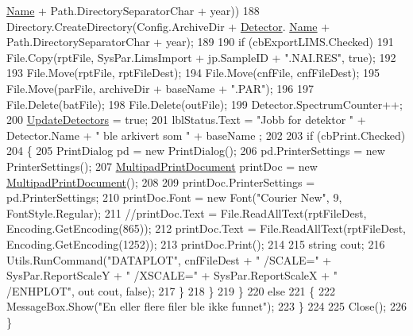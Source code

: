 \begin{DoxyCode}
      \hyperlink{class_scintilab_1_1_detector_aeddbda805641ca8d8f8aaa30aea2f3e0}{Name} + Path.DirectorySeparatorChar + year))
188                         Directory.CreateDirectory(Config.ArchiveDir + \hyperlink{class_scintilab_1_1_form_job_report_acfd377f5214f1677dbfcee75e848fd3e}{Detector}.
      \hyperlink{class_scintilab_1_1_detector_aeddbda805641ca8d8f8aaa30aea2f3e0}{Name} + Path.DirectorySeparatorChar + year);
189 
190                     \textcolor{keywordflow}{if} (cbExportLIMS.Checked)    
191                         File.Copy(rptFile, SysPar.LimsImport + jp.SampleID + \textcolor{stringliteral}{".NAI.RES"}, \textcolor{keyword}{true});
192 
193                     File.Move(rptFile, rptFileDest);
194                     File.Move(cnfFile, cnfFileDest);
195                     File.Move(parFile, archiveDir + baseName + \textcolor{stringliteral}{".PAR"});
196                     
197                     File.Delete(batFile);
198                     File.Delete(outFile);
199                     Detector.SpectrumCounter++;
200                     \hyperlink{class_scintilab_1_1_form_job_report_a03fca1552c0a65c4e526318e880941ff}{UpdateDetectors} = \textcolor{keyword}{true};
201                     lblStatus.Text = \textcolor{stringliteral}{"Jobb for detektor "} + Detector.Name + \textcolor{stringliteral}{" ble arkivert som "} + baseName
      ;
202 
203                     \textcolor{keywordflow}{if} (cbPrint.Checked)
204                     \{
205                         PrintDialog pd = \textcolor{keyword}{new} PrintDialog();
206                         pd.PrinterSettings = \textcolor{keyword}{new} PrinterSettings();
207                         \hyperlink{class_multipad_print_document}{MultipadPrintDocument} printDoc = \textcolor{keyword}{new} 
      \hyperlink{class_multipad_print_document}{MultipadPrintDocument}();
208 
209                         printDoc.PrinterSettings = pd.PrinterSettings;
210                         printDoc.Font = \textcolor{keyword}{new} Font(\textcolor{stringliteral}{"Courier New"}, 9, FontStyle.Regular);
211                         \textcolor{comment}{//printDoc.Text = File.ReadAllText(rptFileDest, Encoding.GetEncoding(865));}
212                         printDoc.Text = File.ReadAllText(rptFileDest, Encoding.GetEncoding(1252));
213                         printDoc.Print();
214 
215                         \textcolor{keywordtype}{string} cout;
216                         Utils.RunCommand(\textcolor{stringliteral}{"DATAPLOT"}, cnfFileDest + \textcolor{stringliteral}{" /SCALE="} + SysPar.ReportScaleY + \textcolor{stringliteral}{"
       /XSCALE="} + SysPar.ReportScaleX + \textcolor{stringliteral}{" /ENHPLOT"}, out cout, \textcolor{keyword}{false});
217                     \}
218                 \}
219             \}
220             \textcolor{keywordflow}{else}
221             \{
222                 MessageBox.Show(\textcolor{stringliteral}{"En eller flere filer ble ikke funnet"});
223             \}
224 
225             Close();
226         \}
\end{DoxyCode}
